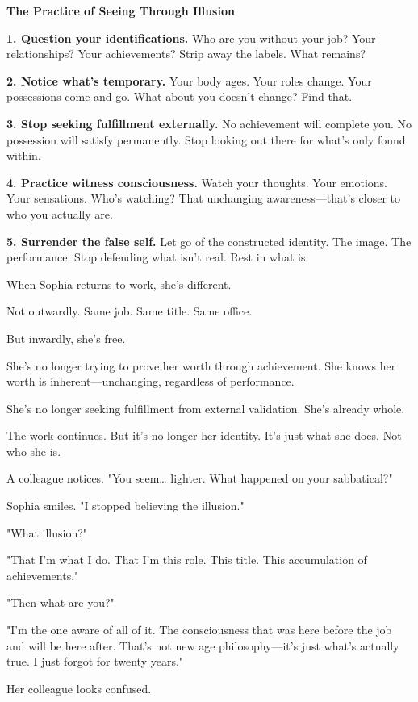 \documentclass[11pt,twoside]{book}
\begin{document}
\begin{practicebox}
\textbf{The Practice of Seeing Through Illusion}

\textbf{1. Question your identifications.} Who are you without your job? Your relationships? Your achievements? Strip away the labels. What remains?

\textbf{2. Notice what's temporary.} Your body ages. Your roles change. Your possessions come and go. What about you doesn't change? Find that.

\textbf{3. Stop seeking fulfillment externally.} No achievement will complete you. No possession will satisfy permanently. Stop looking out there for what's only found within.

\textbf{4. Practice witness consciousness.} Watch your thoughts. Your emotions. Your sensations. Who's watching? That unchanging awareness—that's closer to who you actually are.

\textbf{5. Surrender the false self.} Let go of the constructed identity. The image. The performance. Stop defending what isn't real. Rest in what is.
\end{practicebox}

When Sophia returns to work, she's different.

Not outwardly. Same job. Same title. Same office.

But inwardly, she's free.

She's no longer trying to prove her worth through achievement. She knows her worth is inherent—unchanging, regardless of performance.

She's no longer seeking fulfillment from external validation. She's already whole.

The work continues. But it's no longer her identity. It's just what she does. Not who she is.

A colleague notices. "You seem\ldots{} lighter. What happened on your sabbatical?"

Sophia smiles. "I stopped believing the illusion."

"What illusion?"

"That I'm what I do. That I'm this role. This title. This accumulation of achievements."

"Then what are you?"

"I'm the one aware of all of it. The consciousness that was here before the job and will be here after. That's not new age philosophy—it's just what's actually true. I just forgot for twenty years."

Her colleague looks confused.
\end{document}
